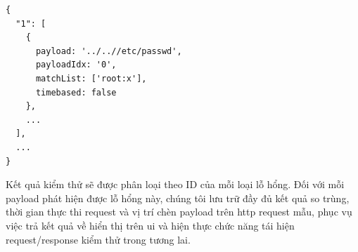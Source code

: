 \begin{lstlisting}[style=ES6, label={lst:example-result}, caption={Cấu trúc kết quả kiểm thử}]
{
  "1": [
    {
      payload: '../..//etc/passwd',
      payloadIdx: '0',
      matchList: ['root:x'],
      timebased: false
    },
    ...
  ],
  ...
}
\end{lstlisting}
Kết quả kiểm thử sẽ được phân loại theo ID của mỗi loại lỗ hổng. Đối với mỗi payload phát hiện được lỗ hổng này, chúng tôi lưu trữ đầy đủ kết quả so trùng, thời gian thực thi request và vị trí chèn payload trên \acrshort{http} request mẫu, phục vụ việc trả kết quả về hiển thị trên \acrshort{ui} và hiện thực chức năng tái hiện request/response kiểm thử trong tương lai.